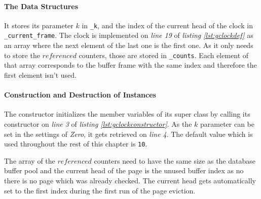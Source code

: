 \paragraph{The Data Structures}

\begin{@empty}
	\lstset{
		language = [ISO]C++,
		style = basic
	}
	\begin{code}[ht!]
		\caption{Data Structures of the Class \lstinline{page_evictioner_gclock}} \label{lst:gclockdef}
		
	\end{code}
\end{@empty}

	It stores its parameter $k$ in \lstinline{_k}, and the index of the current head of the clock in \lstinline{_current_frame}. The clock is implemented on \emph{line 19} of \emph{listing \ref{lst:gclockdef}} as an array where the next element of the last one is the first one. As it only needs to store the $referenced$ counters, those are stored in \lstinline{_counts}. Each element of that array corresponds to the buffer frame with the same index and therefore the first element isn't used.

\paragraph{Construction and Destruction of Instances}

\begin{@empty}
	\lstset{
		language = [ISO]C++,
		style = basic
	}
	\begin{code}[ht!]
		\caption{Constructor and Destructor of the Class \lstinline{page_evictioner_gclock}} \label{lst:gclockconstructor}
		
	\end{code}
\end{@empty}

	The constructor initializes the member variables of its super class by calling its constructor on \emph{line 3} of \emph{listing \ref{lst:gclockconstructor}}. As the $k$ parameter can be set in the settings of \textit{Zero}, it gets retrieved on \emph{line 4}. The default value which is used throughout the rest of this chapter is \lstinline{10}.
	
	The array of the $referenced$ counters need to have the same size as the database buffer pool and the current head of the page is the unused buffer index as no there is no page which was already checked. The current head gets automatically set to the first index during the first run of the page eviction.
	
